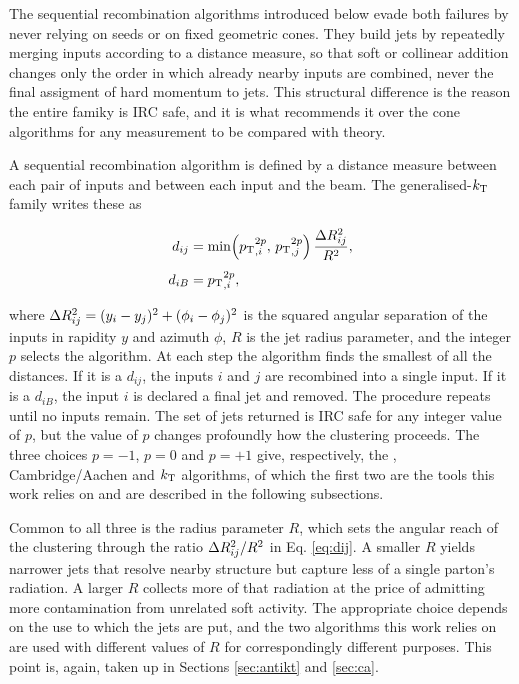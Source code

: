 The sequential recombination algorithms introduced below evade both failures by
never relying on seeds or on fixed geometric cones. They build jets by repeatedly
merging inputs according to a distance measure, so that soft or collinear addition
changes only the order in which already nearby inputs are combined, never the final
assigment of hard momentum to jets. This structural difference is the reason 
the entire famiky is IRC safe, and it is what recommends it over the
cone algorithms for any measurement to be compared with theory.

A sequential recombination algorithm is defined by a distance measure between
each pair of inputs and between each input and the beam. The generalised-$k_{\mathrm{T}}$
family \cite{Salam_2010} writes these as

\begin{align}
  d_{ij} &= \min\!\left( p_{\mathrm{T}}{}_{,i}^{2p},\, p_{\mathrm{T}}{}_{,j}^{2p} \right)
           \frac{\Delta R_{ij}^2}{R^2}, \label{eq:dij}\\[4pt]
  d_{iB} &= p_{\mathrm{T}}{}_{,i}^{2p}, \label{eq:diB}
\end{align}

where $\Delta R_{ij}^2 = (y_i - y_j)^2 + (\phi_i - \phi_j)^2$ is the squared angular
separation of the inputs in rapidity $y$ and azimuth $\phi$, $R$ is the jet radius
parameter, and the integer $p$ selects the algorithm. At each step the algorithm
finds the smallest of all the distances. If it is a $d_{ij}$, the inputs $i$ and
$j$ are recombined into a single input. If it is a $d_{iB}$, the input $i$ is
declared a final jet and removed. The procedure repeats until no inputs remain.
The set of jets returned is IRC safe for any integer value of $p$, but the value
of $p$ changes profoundly how the clustering proceeds. The three choices $p=-1$,
$p=0$ and $p=+1$ give, respectively, the \antikt{}, Cambridge/Aachen and $k_{\mathrm{T}}$
algorithms, of which the first two are the tools this work relies on and are
described in the following subsections.

Common to all three is the radius parameter $R$, which sets the angular reach of
the clustering through the ratio $\Delta R_{ij}^2/R^2$ in Eq. \eqref{eq:dij}. A smaller
$R$ yields narrower jets that resolve nearby structure but capture less of a single
parton's radiation. A larger $R$ collects more of that radiation at the price of
admitting more contamination from unrelated soft activity. The appropriate choice
depends on the use to which the jets are put, and the two algorithms this work
relies on are used with different values of $R$ for correspondingly different
purposes. This point is, again, taken up in Sections \ref{sec:antikt}
and \ref{sec:ca}.

